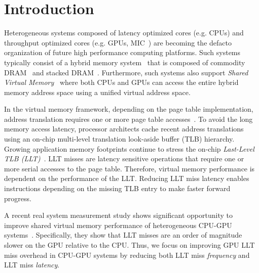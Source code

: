 
\section{Introduction}

\noindent Heterogeneous systems composed of latency optimized cores
(e.g. CPUs) and throughput optimized cores (e.g. GPUs, MIC~\cite{MIC})
are becoming the defacto organization of future high performance
computing platforms. Such systems typically consist of a hybrid memory
system~\cite{hbm_intel,hbm_amd,hbm_nvidia} that is composed of
commodity DRAM~\cite{ddr4-spec} and stacked
DRAM~\cite{hbm-spec,hmc_spec}. Furthermore, such systems also support
{\em Shared Virtual Memory}~\cite{HSA,UVM} where both CPUs and GPUs
can access the entire hybrid memory address space using a unified
virtual address space.

In the virtual memory framework, depending on the page table
implementation, address translation requires one or more page table
accesses~\cite{Bhargava2008}. To avoid the long memory access latency,
processor architects cache recent address translations using an
on-chip multi-level translation look-aside buffer (TLB) hierarchy.
Growing application memory footprints continue to stress the on-chip 
{\em Last-Level TLB (LLT)}~\cite{spectlb, Basu2013, SharedLLT, COLT}. 
LLT misses are latency sensitive operations that require one or more 
serial accesses to the page table. Therefore, virtual memory 
performance is dependent on the performance of the LLT. Reducing LLT
miss latency enables instructions depending on the missing TLB entry
to make faster forward progress.

A recent real system measurement study shows significant opportunity
to improve shared virtual memory performance of heterogeneous CPU-GPU
systems~\cite{vesley2016ispass}. Specifically, they show that LLT
misses are an order of magnitude slower on the GPU relative to the
CPU. Thus, we focus on improving GPU LLT miss overhead in CPU-GPU
systems by reducing both LLT miss {\em frequency} and LLT miss {\em
latency}.




